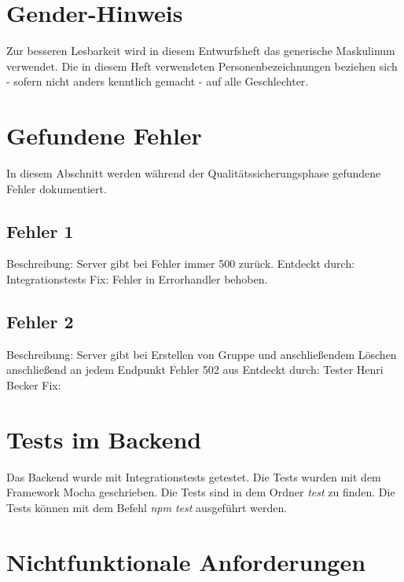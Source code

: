 \documentclass{qualitätssicherungsheft}
\begin{document}

\maketitle
\tableofcontents
\newpage

\section*{Gender-Hinweis}
Zur besseren Lesbarkeit wird in diesem Entwurfsheft das generische Maskulinum verwendet.
Die in diesem Heft verwendeten Personenbezeichnungen beziehen sich - sofern nicht anders kenntlich gemacht - auf alle Geschlechter.
\newpage

\section{Gefundene Fehler}
In diesem Abschnitt werden während der Qualitätssicherungsphase gefundene Fehler dokumentiert.

\subsection{Fehler 1}
Beschreibung: Server gibt bei Fehler immer 500 zurück. \newline
Entdeckt durch: Integrationstests \newline
Fix: Fehler in Errorhandler behoben.

\subsection{Fehler 2}
Beschreibung: Server gibt bei Erstellen von Gruppe und anschließendem Löschen anschließend an jedem Endpunkt Fehler 502 aus \newline
Entdeckt durch: Tester Henri Becker \newline
Fix: 

\section{Tests im Backend}
Das Backend wurde mit Integrationstests getestet. Die Tests wurden mit dem Framework Mocha geschrieben. 
Die Tests sind in dem Ordner \textit{test} zu finden. Die Tests können mit dem Befehl \textit{npm test} ausgeführt werden.

\section{Nichtfunktionale Anforderungen}
\end{document}
